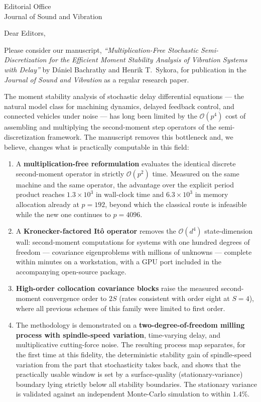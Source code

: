 \documentclass[11pt]{letter}
\date{\today}
\begin{document}
\begin{letter}{Editorial Office \\ Journal of Sound and Vibration}

\opening{Dear Editors,}

Please consider our manuscript, \emph{``Multiplication-Free Stochastic
Semi-Discretization for the Efficient Moment Stability Analysis of Vibration
Systems with Delay''} by D\'aniel Bachrathy and Henrik T.~Sykora, for
publication in the \emph{Journal of Sound and Vibration} as a regular research
paper.

The moment stability analysis of stochastic delay differential equations ---
the natural model class for machining dynamics, delayed feedback control, and
connected vehicles under noise --- has long been limited by the
$\mathcal{O}(p^4)$ cost of assembling and multiplying the second-moment step
operators of the semi-discretization framework. The manuscript removes this
bottleneck and, we believe, changes what is practically computable in this
field:

\begin{enumerate}
\item A \textbf{multiplication-free reformulation} evaluates the identical
      discrete second-moment operator in strictly $\mathcal{O}(p^2)$ time.
      Measured on the same machine and the same operator, the advantage over
      the explicit period product reaches $1.3\times10^{3}$ in wall-clock time
      and $6.3\times10^{3}$ in memory allocation already at $p=192$, beyond
      which the classical route is infeasible while the new one continues to
      $p=4096$.
\item A \textbf{Kronecker-factored It\^o operator} removes the
      $\mathcal{O}(d^4)$ state-dimension wall: second-moment computations for
      systems with one hundred degrees of freedom --- covariance eigenproblems
      with millions of unknowns --- complete within minutes on a workstation,
      with a GPU port included in the accompanying open-source package.
\item \textbf{High-order collocation covariance blocks} raise the measured
      second-moment convergence order to $2S$ (rates consistent with order
      eight at $S=4$), where all previous schemes of this family were limited
      to first order.
\item The methodology is demonstrated on a \textbf{two-degree-of-freedom
      milling process with spindle-speed variation}, time-varying delay, and
      multiplicative cutting-force noise. The resulting process map separates,
      for the first time at this fidelity, the deterministic stability gain of
      spindle-speed variation from the part that stochasticity takes back, and
      shows that the practically usable window is set by a surface-quality
      (stationary-variance) boundary lying strictly below all stability
      boundaries. The stationary variance is validated against an independent
      Monte-Carlo simulation to within $1.4\%$.
\end{enumerate}


\end{letter}
\end{document}
